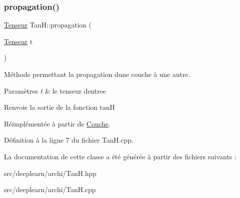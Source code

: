 \subsubsection{\texorpdfstring{propagation()}{propagation()}}
{\footnotesize\ttfamily \hyperlink{class_tenseur}{Tenseur} Tan\+H\+::propagation (\begin{DoxyParamCaption}\item[{\hyperlink{class_tenseur}{Tenseur}}]{t }\end{DoxyParamCaption})\hspace{0.3cm}{\ttfamily [virtual]}}



Méthode permettant la propagation d\textquotesingle{}une couche à une autre. 


\begin{DoxyParams}{Paramètres}
{\em t} & le tenseur d\textquotesingle{}entree \\
\hline
\end{DoxyParams}
\begin{DoxyReturn}{Renvoie}
la sortie de la fonction tanH 
\end{DoxyReturn}


Réimplémentée à partir de \hyperlink{class_couche_a1f0ed59e21020f5d4f37933af4d1b1e5}{Couche}.



Définition à la ligne 7 du fichier Tan\+H.\+cpp.



La documentation de cette classe a été générée à partir des fichiers suivants \+:\begin{DoxyCompactItemize}
\item 
src/deeplearn/archi/Tan\+H.\+hpp\item 
src/deeplearn/archi/Tan\+H.\+cpp\end{DoxyCompactItemize}
